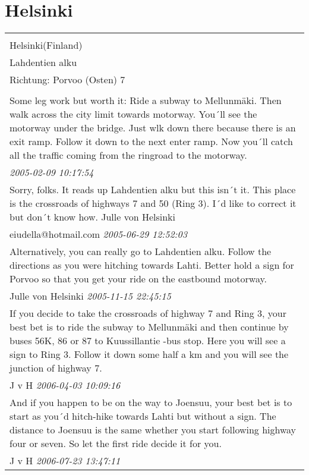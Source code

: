 \documentclass[a4paper,12pt]{article}
\begin{document}
\section{Helsinki}
\begin{tabular}{|p{13cm}|}
\hline\\
Helsinki(Finland)\\
Lahdentien alku\\
Richtung: Porvoo (Osten) 7 \\
\hline\\
Some leg work but worth it: Ride a subway to Mellunmäki. Then walk across the city limit towards motorway. You´ll see the motorway under the bridge. Just wlk down there because there is an exit ramp. Follow it down to the next enter ramp. Now you´ll catch all the traffic coming from the ringroad to the motorway. \\
\textit{ 2005-02-09 10:17:54 }\\\hline Sorry, folks. It reads up Lahdentien alku but this isn´t it. This place is the crossroads of highways 7 and 50 (Ring 3). I´d like to correct it but don´t know how.
Julle von Helsinki \\
eiudella@hotmail.com \textit{ 2005-06-29 12:52:03 }\\\hline Alternatively, you can really go to Lahdentien alku. Follow the directions as you were hitching towards Lahti. Better hold a sign for Porvoo so that you get your ride on the eastbound motorway. \\
Julle von Helsinki \textit{ 2005-11-15 22:45:15 }\\\hline If you decide to take the crossroads of highway 7 and Ring 3, your best bet is to ride the subway to Mellunmäki and then continue by buses 56K, 86 or 87 to Kuussillantie -bus stop. Here you will see a sign to Ring 3. Follow it down some half a km and you will see the junction of highway 7. \\
J v H \textit{ 2006-04-03 10:09:16 }\\\hline And if you happen to be on the way to Joensuu, your best bet is to start as you´d hitch-hike towards Lahti but without a sign. The distance to Joensuu is the same whether you start following highway four or seven. So let the first ride decide it for you. \\
J v H \textit{ 2006-07-23 13:47:11 }\\\hline
\end{tabular}
\end{document}
